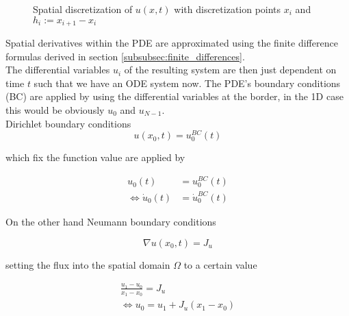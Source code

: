 \documentclass{scrartcl}[12pt, halfparskip]
\begin{document}
\begin{figure}[H]
	\centering
	\caption{Spatial discretization of $u(x,t)$ with discretization points $x_i$ and $h_i:=x_{i+1} - x_i$}
	\label{fig:pde_discretization_method_of_lines}
\end{figure}


Spatial derivatives within the PDE are approximated using the finite difference formulas derived in section \ref{subsubsec:finite_differences}. \\
The differential variables $u_i$ of the resulting system are then just dependent on time $t$ such that we have an ODE system now. The PDE's boundary conditions (BC) are applied by using the differential variables at the border, in the 1D case this would be obviously $u_0$ and $u_{N-1}$. \\
Dirichlet boundary conditions 
\begin{equation}
u(x_0, t) = u_0^{BC}(t)
\end{equation}

which fix the function value are applied by

\begin{align}
	u_0(t) & = u_0^{BC}(t) \\
	\Leftrightarrow \dot{u}_0(t) & = \dot{u}_0^{BC}(t) \nonumber
\end{align}

On the other hand Neumann boundary conditions

\begin{equation}
	\nabla u(x_{0},t) = J_u
\end{equation}

setting the flux into the spatial domain $\Omega$ to a certain value

\begin{align}
	\frac{u_{1} - u_{0}}{x_{1} - x_{0}} = J_u  \\
	\Leftrightarrow u_0 = u_1 + J_u (x_1 - x_0) \nonumber
\end{align}
\end{document}
